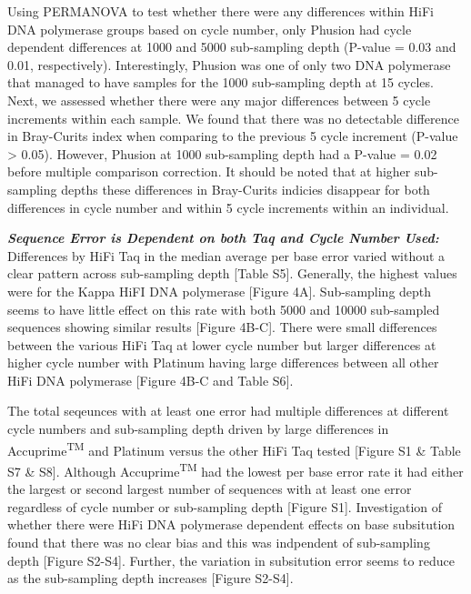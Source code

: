 \documentclass[12pt,]{article}
\begin{document}
Using PERMANOVA to test whether there were any differences within HiFi
DNA polymerase groups based on cycle number, only Phusion had cycle
dependent differences at 1000 and 5000 sub-sampling depth (P-value =
0.03 and 0.01, respectively). Interestingly, Phusion was one of only two
DNA polymerase that managed to have samples for the 1000 sub-sampling
depth at 15 cycles. Next, we assessed whether there were any major
differences between 5 cycle increments within each sample. We found that
there was no detectable difference in Bray-Curits index when comparing
to the previous 5 cycle increment (P-value \textgreater{} 0.05).
However, Phusion at 1000 sub-sampling depth had a P-value = 0.02 before
multiple comparison correction. It should be noted that at higher
sub-sampling depths these differences in Bray-Curits indicies disappear
for both differences in cycle number and within 5 cycle increments
within an individual.

\textbf{\emph{Sequence Error is Dependent on both Taq and Cycle Number
Used:}} Differences by HiFi Taq in the median average per base error
varied without a clear pattern across sub-sampling depth {[}Table S5{]}.
Generally, the highest values were for the Kappa HiFI DNA polymerase
{[}Figure 4A{]}. Sub-sampling depth seems to have little effect on this
rate with both 5000 and 10000 sub-sampled sequences showing similar
results {[}Figure 4B-C{]}. There were small differences between the
various HiFi Taq at lower cycle number but larger differences at higher
cycle number with Platinum having large differences between all other
HiFi DNA polymerase {[}Figure 4B-C and Table S6{]}.

The total seqeunces with at least one error had multiple differences at
different cycle numbers and sub-sampling depth driven by large
differences in Accuprime\textsuperscript{TM} and Platinum versus the
other HiFi Taq tested {[}Figure S1 \& Table S7 \& S8{]}. Although
Accuprime\textsuperscript{TM} had the lowest per base error rate it had
either the largest or second largest number of sequences with at least
one error regardless of cycle number or sub-sampling depth {[}Figure
S1{]}. Investigation of whether there were HiFi DNA polymerase dependent
effects on base subsitution found that there was no clear bias and this
was indpendent of sub-sampling depth {[}Figure S2-S4{]}. Further, the
variation in subsitution error seems to reduce as the sub-sampling depth
increases {[}Figure S2-S4{]}.
\end{document}
